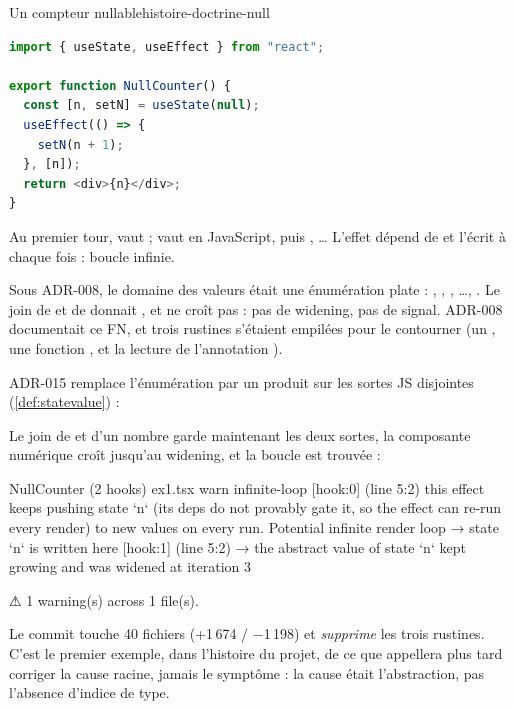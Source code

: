 \begin{exemple}{Un compteur nullable}{histoire-doctrine-null}
\begin{lstlisting}[language=TypeScript,caption={\file{/tmp/ch26/ex1.tsx}}]
import { useState, useEffect } from "react";

export function NullCounter() {
  const [n, setN] = useState(null);
  useEffect(() => {
    setN(n + 1);
  }, [n]);
  return <div>{n}</div>;
}
\end{lstlisting}
Au premier tour,  vaut  ;  vaut  en JavaScript, puis , \dots{} L'effet dépend de  et l'écrit à chaque fois : boucle infinie.
\end{exemple}

Sous ADR-008, le domaine des valeurs était une énumération plate : , , , \dots, . Le join de  et de  donnait , et  ne croît pas : pas de widening, pas de signal. ADR-008 documentait ce FN, et trois rustines s'étaient empilées pour le contourner (un , une fonction , et la lecture de l'annotation ).

ADR-015 remplace l'énumération par un produit sur les sortes JS disjointes (\cref{def:statevalue}) :


Le join de  et d'un nombre garde maintenant les deux sortes, la composante numérique croît jusqu'au widening, et la boucle est trouvée :

\begin{sortie}
  NullCounter  (2 hooks)  ex1.tsx
    warn   infinite-loop  [hook:0]  (line 5:2)  this effect keeps pushing state `n` (its deps do not provably gate it, so the effect can re-run every render) to new values on every run. Potential infinite render loop
       → state `n` is written here [hook:1] (line 5:2)
       → the abstract value of state `n` kept growing and was widened at iteration 3

⚠  1 warning(s) across 1 file(s).
\end{sortie}

Le commit  touche 40 fichiers (+1\,674 / $-$1\,198) et \emph{supprime} les trois rustines. C'est le premier exemple, dans l'histoire du projet, de ce que  appellera plus tard \og corriger la cause racine, jamais le symptôme\fg{} : la cause était l'abstraction, pas l'absence d'indice de type.

